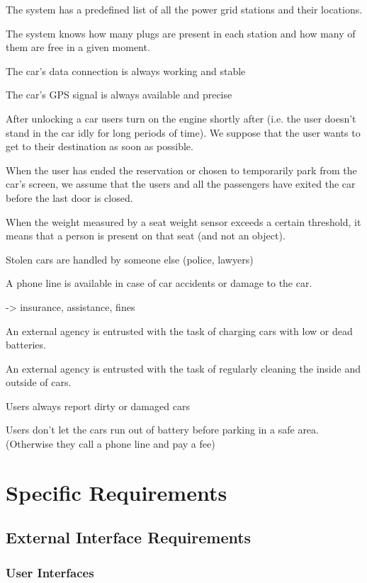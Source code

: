 \documentclass[english]{article}
\begin{document}
The system has a predefined list of all the power grid stations and their locations.

The system knows how many plugs are present in each station and how many of them are free in a given moment.


The car’s data connection is always working and stable

The car’s GPS signal is always available and precise


After unlocking a car users turn on the engine shortly after (i.e. the user doesn't stand in the car idly for long periods of time). We suppose that the user wants to get to their destination as soon as possible.


When the user has ended the reservation or chosen to temporarily park from the car’s screen, we assume that the users and all the passengers have exited the car before the last door is closed.


When the weight measured by a seat weight sensor exceeds a certain threshold, it means that a person is present on that seat (and not an object).


Stolen cars are handled by someone else (police, lawyers)


A phone line is available in case of car accidents or damage to the car.

-> insurance, assistance, fines


An external agency is entrusted with the task of charging cars with low or dead batteries.


An external agency is entrusted with the task of regularly cleaning the inside and outside of cars.

Users always report dirty or damaged cars

Users don't let the cars run out of battery before parking in a safe area. (Otherwise they call a phone line and pay a fee)

\newpage

\section{Specific Requirements}

\subsection{External Interface Requirements}

\subsubsection{User Interfaces}
\end{document}

